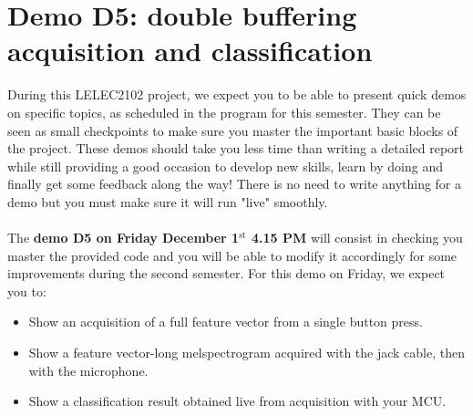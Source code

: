 \section{Demo D5: double buffering acquisition and classification}
%
During this LELEC2102 project, we expect you to be able to present quick demos on specific topics, as scheduled in the program for this semester. They can be seen as small checkpoints to make sure you master the important basic blocks of the project. These demos should take you less time than writing a detailed report while still providing a good occasion to develop new skills, learn by doing and finally get some feedback along the way! There is no need to write anything for a demo but you must make sure it will run "live" smoothly. \\
\\
The \textbf{demo D5 on Friday December 1$^{\text{st}}$ 4.15 PM} will consist in checking you master the provided code and you will be able to modify it accordingly for some improvements during the second semester. For this demo on Friday, we expect you to:
%
\begin{itemize}
    \item Show an acquisition of a full feature vector from a single button press.
    \item Show a feature vector-long melspectrogram acquired with the jack cable, then with the microphone.
    \item Show a classification result obtained live from acquisition with your MCU.
\end{itemize}
